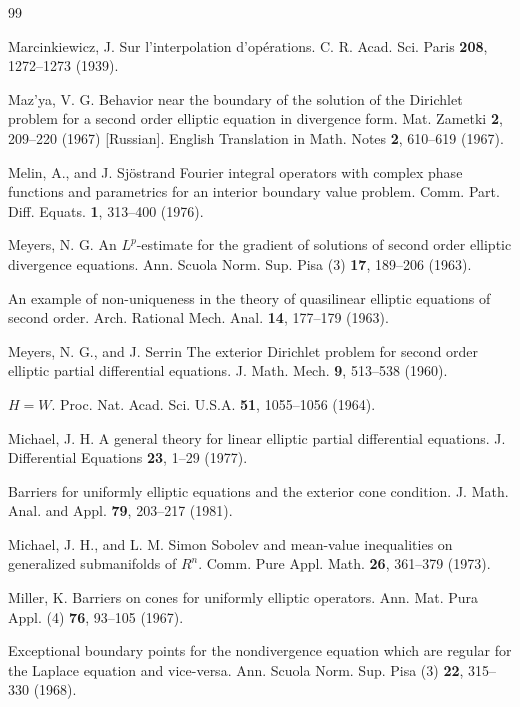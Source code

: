 
\begin{thebibliography}{99}

Marcinkiewicz, J.
Sur l’interpolation d’opérations. C. R. Acad. Sci. Paris \textbf{208}, 1272--1273 (1939).

Maz'ya, V. G.
Behavior near the boundary of the solution of the Dirichlet problem for a second order
elliptic equation in divergence form. Mat. Zametki \textbf{2}, 209--220 (1967) [Russian]. English
Translation in Math. Notes \textbf{2}, 610--619 (1967).

Melin, A., and J. Sj\"ostrand
Fourier integral operators with complex phase functions and parametrics for an interior
boundary value problem. Comm. Part. Diff. Equats. \textbf{1}, 313--400 (1976).

Meyers, N. G.
An $L^p$-estimate for the gradient of solutions of second order elliptic divergence equations.
Ann. Scuola Norm. Sup. Pisa (3) \textbf{17}, 189--206 (1963).

An example of non-uniqueness in the theory of quasilinear elliptic equations of second order.
Arch. Rational Mech. Anal. \textbf{14}, 177--179 (1963).

Meyers, N. G., and J. Serrin
The exterior Dirichlet problem for second order elliptic partial differential equations.
J. Math. Mech. \textbf{9}, 513--538 (1960).

$H = W$. Proc. Nat. Acad. Sci. U.S.A. \textbf{51}, 1055--1056 (1964).

Michael, J. H.
A general theory for linear elliptic partial differential equations. J. Differential Equations \textbf{23},
1--29 (1977).

Barriers for uniformly elliptic equations and the exterior cone condition. J. Math. Anal.
and Appl. \textbf{79}, 203--217 (1981).

Michael, J. H., and L. M. Simon
Sobolev and mean-value inequalities on generalized submanifolds of $R^n$. Comm. Pure
Appl. Math. \textbf{26}, 361--379 (1973).

Miller, K.
Barriers on cones for uniformly elliptic operators. Ann. Mat. Pura Appl. (4) \textbf{76}, 93--105
(1967).

Exceptional boundary points for the nondivergence equation which are regular for the
Laplace equation and vice-versa. Ann. Scuola Norm. Sup. Pisa (3) \textbf{22}, 315--330 (1968).


\end{thebibliography}
